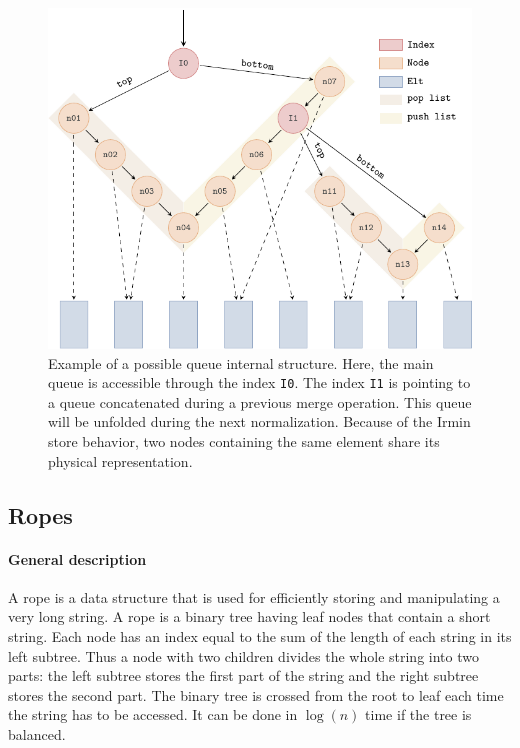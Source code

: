 \documentclass{article}
\newcommand{\irmin}{Irmin\xspace}
\newcommand{\code}[1]{\texttt{#1}}
\begin{document}
\begin{figure}[hbt]
\centering
\includegraphics[scale=0.8]{images/queue.pdf}
\caption{Example of a possible queue internal structure. Here, the main queue is accessible through the index \code{I0}. The index \code{I1} is pointing to a queue concatenated during a previous merge operation. This queue will be unfolded during the next normalization. Because of the \irmin store behavior,  two nodes containing the same element share its physical representation.}
\label{queuegraph}
\end{figure}


\subsection{Ropes}

\paragraph{General description}
A rope is a data structure that is used for efficiently storing and manipulating a very long string.
A rope is a binary tree having leaf nodes that contain a short string.
Each node has an index equal to the sum of the length of each string in its left subtree.
Thus a node with two children divides the whole string into two parts: the left subtree stores the first part of the string and the right subtree stores the second part.
The binary tree is crossed from the root to leaf each time the string has to be accessed.
It can be done in $\log (n)$ time if the tree is balanced.
\end{document}
